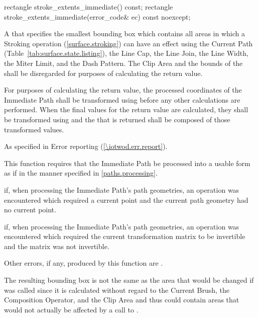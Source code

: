 \begin{itemdecl}
rectangle stroke_extents_immediate() const;
rectangle stroke_extents_immediate(error_code& ec) const noexcept;
\end{itemdecl}
\begin{itemdescr}
\pnum
\returns
A  that specifies the smallest bounding box which contains all areas in which a Stroking operation (\ref{surface.stroking}) can have an effect using the Current Path (Table~\ref{tab:surface.state.listing}), the Line Cap, the Line Join, the Line Width, the Miter Limit, and the Dash Pattern. The Clip Area and the bounds of the \underlyingsurface shall be disregarded for purposes of calculating the return value.

\pnum
For purposes of calculating the return value, the processed coordinates of the Immediate Path shall be transformed using  before any other calculations are performed. When the final values for the return value are calculated, they shall be transformed using  and the  that is returned shall be composed of those transformed values.

\pnum
\throws
As specified in Error reporting (\ref{\iotwod.err.report}).

\pnum
\remarks
This function requires that the Immediate Path be processed into a usable form as if in the manner specified in \ref{paths.processing}.

\pnum
\errors
{} if, when processing the Immediate Path's path geometries, an operation was encountered which required a current point and the current path geometry had no current point.

\pnum
{} if, when processing the Immediate Path's path geometries, an operation was encountered which required the current transformation matrix to be invertible and the matrix was not invertible.

\pnum
Other errors, if any, produced by this function are .

\pnum
\realnotes
The resulting bounding box is not the same as the area that would be changed if  was called since it is calculated without regard to the Current Brush, the Composition Operator, and the Clip Area and thus could contain areas that would not actually be affected by a call to .
\end{itemdescr}

